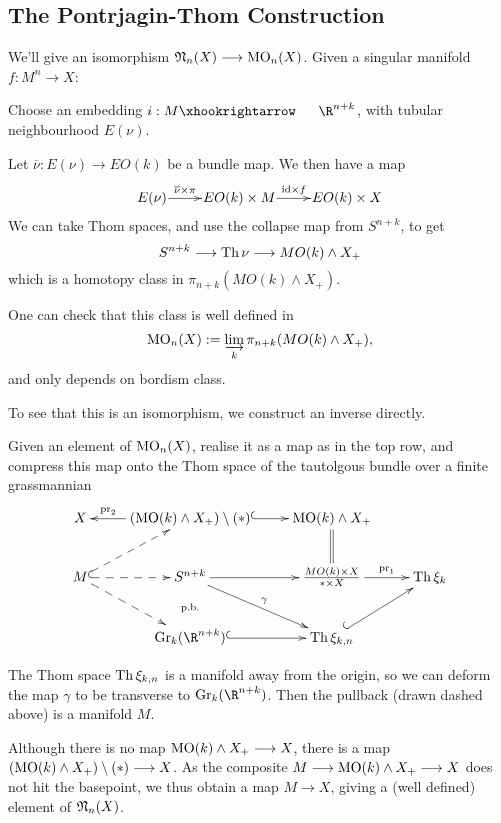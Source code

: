\documentclass[11pt]{article}
\begin{document}
\subsection{The Pontrjagin-Thom Construction}
We'll give an isomorphism $\mathfrak{N}_n(X)\longrightarrow\operatorname{{MO}}_n(X)$. Given a singular manifold $f:M^n\to X$:
\begin{itemise}
\item Choose an embedding $i:M\cofibration\R^{n+k}$, with tubular neighbourhood $E(\nu)$.
\item Let $\overline{\nu}:E(\nu)\to EO(k)$ be a bundle map. We then have a map
\[\vcenter{\xymatrix@1{
E(\nu)\ar[r]^-{\overline{\nu}\times\pi}
&%
EO(k)\times M
\ar[r]^-{\id\times f}
&%
EO(k)\times X%
}}\]
We can take Thom spaces, and use the collapse map from $S^{n+k}$, to get
\[S^{n+k}\longrightarrow\operatorname{Th}\nu\longrightarrow MO(k)\wedge X_+\]
which is a homotopy class in $\pi_{n+k}(MO(k)\wedge X_+)$.
\item One can check that this class is well defined in
\[\operatorname{{MO}}_n(X):=\varinjlim_k\pi_{n+k}(MO(k)\wedge X_+),\]
and only depends on bordism class.
\end{itemise}
To see that this is an isomorphism, we construct an inverse directly.
\begin{itemise}
\item Given an element of $\operatorname{{MO}}_n(X)$, realise it as a map as in the top row, and compress this map onto the Thom space of the tautolgous bundle over a finite grassmannian
\[\xymatrix{
X&
(\MO(k)\wedge X_+)\setminus(\ast)
\ar@{^{(}->}[r]
\ar[l]_-{\textup{pr}_2}
&
\MO(k)\wedge X_+
\ar@{=}[d]
&
\\
M
\ar@{-->}[ur]
\ar@{^{(}-->}[r]
\ar@{-->}[rd]
&%
S^{n+k}
\ar@{}[d]|{\textup{p.b.}}
\ar[r]
\ar[rd]^\gamma
&%
\frac{MO(k)\times X}{\ast\times X}
\ar[r]^-{\textup{pr}_1}
&%
\Thom\xi_k
\\&%
\Gr_k(\R^{n+k})
\ar@{^{(}->}[r]
&%
\Thom \xi_{k,n}
\ar@{^{(}->}[ur]
&%
}\]
\item The Thom space $\operatorname{Th} \xi_{k,n}$ is a manifold away from the origin, so we can deform the map $\gamma$ to be transverse to $\Gr_{k}(\R^{n+k})$. Then the pullback (drawn dashed above) is a manifold $M$.
\item Although there is no map $\operatorname{{MO}}(k)\wedge X_+\longrightarrow X$, there is a map $(\operatorname{{MO}}(k)\wedge X_+)\setminus(*)\longrightarrow X$. As the composite $M\longrightarrow\operatorname{{MO}}(k)\wedge X_+\longrightarrow X$ does not hit the basepoint, we thus obtain a map $M\to X$, giving a (well defined) element of $\mathfrak{N}_n(X)$.
\end{itemise}
\end{document}

